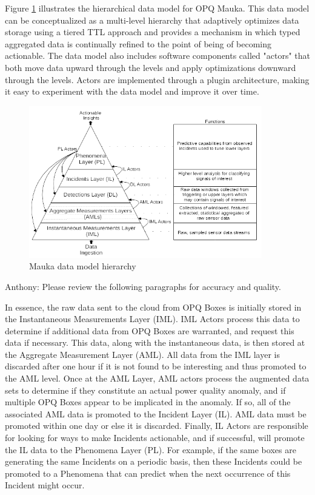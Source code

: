 Figure \ref{fig:mauka-data-model} illustrates the hierarchical data model for OPQ Mauka. This data model can be conceptualized as a multi-level hierarchy that adaptively optimizes data storage using a tiered TTL approach and provides a mechanism in which typed aggregated data is continually refined to the point of being of becoming actionable. The data model also includes software components called "actors" that both move data upward through the levels and apply optimizations downward through the levels. Actors are implemented through a plugin architecture, making it easy to experiment with the data model and improve it over time.

\begin{figure}
\center \includegraphics[width=4in]{images/mauka/mauka-data-model.png}
\caption{Mauka data model hierarchy}
\label{fig:mauka-data-model}
\end{figure}

\begin{tcolorbox}
Anthony: Please review the following paragraphs for accuracy and quality.
\end{tcolorbox}

In essence, the raw data sent to the cloud from OPQ Boxes is initially stored in the Instantaneous Measurements Layer (IML). IML Actors process this data to determine if additional data from OPQ Boxes are warranted, and request this data if necessary. This data, along with the instantaneous data, is then stored at the Aggregate Measurement Layer (AML).  All data from the IML layer is discarded after one hour if it is not found to be interesting and thus promoted to the AML level. Once at the AML Layer, AML actors process the augmented data sets to determine if they constitute an actual power quality anomaly, and if multiple OPQ Boxes appear to be implicated in the anomaly. If so, all of the associated AML data is promoted to the Incident Layer (IL).  AML data must be promoted within one day or else it is discarded.  Finally, IL Actors are responsible for looking for ways to make Incidents actionable, and if successful, will promote the IL data to the Phenomena Layer (PL). For example, if the same boxes are generating the same Incidents on a periodic basis, then these Incidents could be promoted to a Phenomena that can predict when the next occurrence of this Incident might occur.

